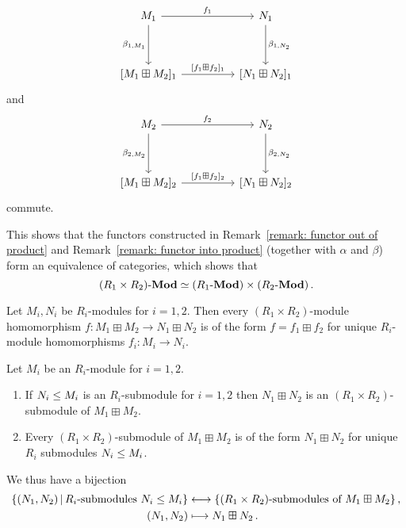 \begin{theorem}
\begin{enumerate}[resume]
\[        \begin{tikzcd}[sep = huge]
            M_1
            \arrow{r}[above]{f_1}
            \arrow{d}[left]{\beta_{1, M_1}}
          & N_1
            \arrow{d}[right]{\beta_{1, N_2}}
          \\
            {[M_1 \boxplus M_2]_1}
            \arrow{r}[above]{{[f_1 \boxplus f_2]_1}}
          & {[N_1 \boxplus N_2]_1}
        \end{tikzcd}
      \]
      and
      \[
        \begin{tikzcd}[sep = huge]
            M_2
            \arrow{r}[above]{f_2}
            \arrow{d}[left]{\beta_{2, M_2}}
          & N_2
            \arrow{d}[right]{\beta_{2, N_2}}
          \\
            {[M_1 \boxplus M_2]_2}
            \arrow{r}[above]{{[f_1 \boxplus f_2]_2}}
          & {[N_1 \boxplus N_2]_2}
        \end{tikzcd}
      \]
      commute.
  \end{enumerate}
\end{theorem}


\begin{remark}
  This shows that the functors constructed in Remark~\ref{remark: functor out of product} and Remark~\ref{remark: functor into product} (together with $\alpha$ and $\beta$) form an equivalence of categories, which shows that
  \[
            (R_1 \times R_2)\text{-}\mathbf{Mod}
    \simeq  (R_1\text{-}\mathbf{Mod}) \times (R_2\text{-}\mathbf{Mod}) \,.
  \]
\end{remark}


\begin{corollary}
  Let $M_i, N_i$ be $R_i$-modules for $i = 1, 2$.
  Then every $(R_1 \times R_2)$-module homomorphism $f \colon M_1 \boxplus M_2 \to N_1 \boxplus N_2$ is of the form $f = f_1 \boxplus f_2$ for unique $R_i$-module homomorphisms $f_i \colon M_i \to N_i$.
\end{corollary}


\begin{lemma}
  Let $M_i$ be an $R_i$-module for $i = 1, 2$.
  \begin{enumerate}
    \item
      If $N_i \leq M_i$ is an $R_i$-submodule for $i = 1, 2$ then $N_1 \boxplus N_2$ is an $(R_1 \times R_2)$-submodule of $M_1 \boxplus M_2$.
    \item
      Every $(R_1 \times R_2)$-submodule of $M_1 \boxplus M_2$ is of the form $N_1 \boxplus N_2$ for unique $R_i$ submodules $N_i \leq M_i$.
  \end{enumerate}
  We thus have a bijection
  \begin{align*}
    \{ (N_1, N_2) \suchthat \text{$R_i$-submodules $N_i \moduleeq M_i$} \}
    &\longleftrightarrow
    \{ \text{$(R_1 \times R_2)$-submodules of $M_1 \boxplus M_2$} \} \,,
    \\
    (N_1, N_2)
    &\longmapsto
    N_1 \boxplus N_2 \,.
  \end{align*}
\end{lemma}


